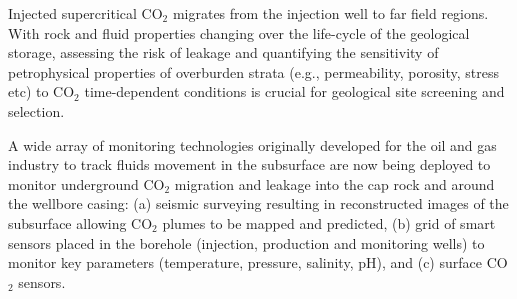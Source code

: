 \documentclass[12pts,a4paper,amsmath,amssymb,floatfix]{article}%
\newcommand{\CO}{CO\ensuremath{_{2}}}
\begin{document}
Injected supercritical \CO\; migrates from the injection well to far field regions. With rock and fluid properties changing over the life-cycle of the geological storage, assessing the risk of leakage and quantifying the sensitivity of petrophysical properties of overburden strata (e.g., permeability, porosity, stress etc) to \CO\; time-dependent conditions is crucial for geological site screening and selection. 

A wide array of monitoring technologies originally developed for the oil and gas industry to track fluids movement in the subsurface are now being deployed to monitor underground \CO\; migration and leakage into the cap rock and around the wellbore casing: (a) seismic surveying resulting in reconstructed images of the subsurface allowing \CO\; plumes to be mapped and predicted, (b) grid of smart sensors placed in the borehole (injection, production and monitoring wells) to monitor key parameters (temperature, pressure, salinity, pH), and (c) surface \CO\; sensors.
 
\end{document}
